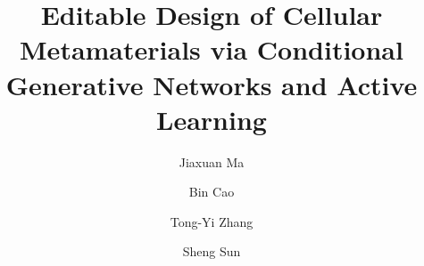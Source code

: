 \documentclass[preprint,review,12pt,authoryear]{elsarticle}
\begin{document}


\begin{frontmatter}



\title{Editable Design of Cellular Metamaterials via Conditional Generative Networks and Active Learning}

\author[1]{Jiaxuan Ma}
\author[3]{Bin Cao}
\author[3]{Tong-Yi Zhang}
\author[1,2]{Sheng Sun}


\address[1]{Materials Genome Institute, Shanghai University, Shanghai, 200444, China}
\address[2]{Shanghai Frontier Science Center of Mechanoinformatics, Shanghai University, Shanghai, 200444, China}
\address[3]{Advanced Materials Thrust, Hong Kong University of Science and Technology (Guangzhou), Guangzhou, 511400, Guangdong, China}



\end{frontmatter}
\end{document}
